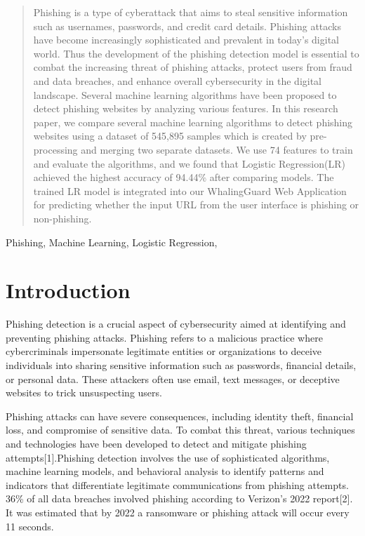 \documentclass[conference]{IEEEtran}
\begin{document}
\begin{abstract}
Phishing is a type of cyberattack that aims to steal sensitive information such as usernames, passwords, and credit card details. Phishing attacks have become increasingly sophisticated and prevalent in today's digital world. Thus the development of the phishing detection model is essential to combat the increasing threat of phishing attacks, protect users from fraud and data breaches, and enhance overall cybersecurity in the digital landscape. Several machine learning algorithms have been proposed to detect phishing websites by analyzing various features. In this research paper, we compare several machine learning algorithms to detect phishing websites using a dataset of 545,895 samples which is created by pre-processing and merging two separate datasets. We use 74 features to train and evaluate the algorithms, and we found that Logistic Regression(LR) achieved the highest accuracy of 94.44\% after comparing models. The trained LR model is integrated into our WhalingGuard Web Application for predicting whether the input URL from the user interface is phishing or non-phishing.
\end{abstract}

\begin{IEEEkeywords}
Phishing, Machine Learning, Logistic Regression, 
\end{IEEEkeywords}

\section{Introduction}

\par 
Phishing detection is a crucial aspect of cybersecurity aimed at identifying and preventing phishing attacks. Phishing refers to a malicious practice where cybercriminals impersonate legitimate entities or organizations to deceive individuals into sharing sensitive information such as passwords, financial details, or personal data. These attackers often use email, text messages, or deceptive websites to trick unsuspecting users.
\par Phishing attacks can have severe consequences, including identity theft, financial loss, and compromise of sensitive data. To combat this threat, various techniques and technologies have been developed to detect and mitigate phishing attempts[1].Phishing detection involves the use of sophisticated algorithms, machine learning models, and behavioral analysis to identify patterns and indicators that differentiate legitimate communications from phishing attempts. 36\% of all data breaches involved phishing according to Verizon’s 2022 report[2]. It was estimated that by 2022 a ransomware or phishing attack will occur every 11 seconds.
\end{document}
